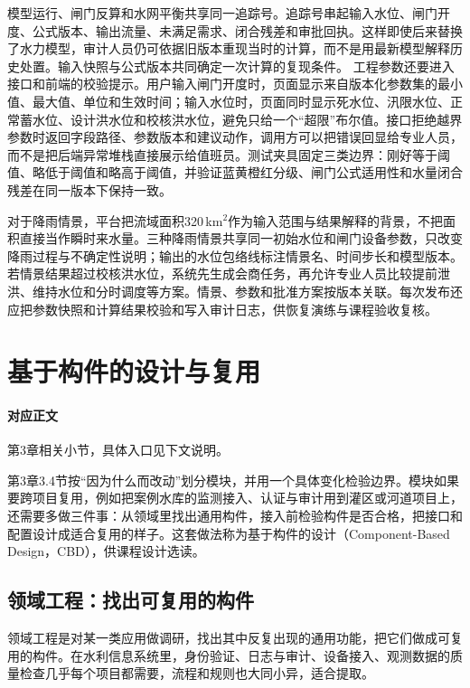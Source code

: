 模型运行、闸门反算和水网平衡共享同一追踪号。追踪号串起输入水位、闸门开度、公式版本、输出流量、未满足需求、闭合残差和审批回执。这样即使后来替换了水力模型，审计人员仍可依据旧版本重现当时的计算，而不是用最新模型解释历史处置。输入快照与公式版本共同确定一次计算的复现条件。
工程参数还要进入接口和前端的校验提示。用户输入闸门开度时，页面显示来自版本化参数集的最小值、最大值、单位和生效时间；输入水位时，页面同时显示死水位、汛限水位、正常蓄水位、设计洪水位和校核洪水位，避免只给一个“超限”布尔值。接口拒绝越界参数时返回字段路径、参数版本和建议动作，调用方可以把错误回显给专业人员，而不是把后端异常堆栈直接展示给值班员。测试夹具固定三类边界：刚好等于阈值、略低于阈值和略高于阈值，并验证蓝黄橙红分级、闸门公式适用性和水量闭合残差在同一版本下保持一致。

对于降雨情景，平台把流域面积320\,km$^2$作为输入范围与结果解释的背景，不把面积直接当作瞬时来水量。三种降雨情景共享同一初始水位和闸门设备参数，只改变降雨过程与不确定性说明；输出的水位包络线标注情景名、时间步长和模型版本。若情景结果超过校核洪水位，系统先生成会商任务，再允许专业人员比较提前泄洪、维持水位和分时调度等方案。情景、参数和批准方案按版本关联。每次发布还应把参数快照和计算结果校验和写入审计日志，供恢复演练与课程验收复核。

\section{基于构件的设计与复用}\label{app:ext-component-based-design}

\paragraph{对应正文}第3章相关小节，具体入口见下文说明。

第3章3.4节按“因为什么而改动”划分模块，并用一个具体变化检验边界。模块如果要跨项目复用，例如把案例水库的监测接入、认证与审计用到灌区或河道项目上，还需要多做三件事：从领域里找出通用构件，接入前检验构件是否合格，把接口和配置设计成适合复用的样子。这套做法称为基于构件的设计（Component-Based Design，CBD），供课程设计选读。

\subsection{领域工程：找出可复用的构件}

领域工程是对某一类应用做调研，找出其中反复出现的通用功能，把它们做成可复用的构件。在水利信息系统里，身份验证、日志与审计、设备接入、观测数据的质量检查几乎每个项目都需要，流程和规则也大同小异，适合提取。

